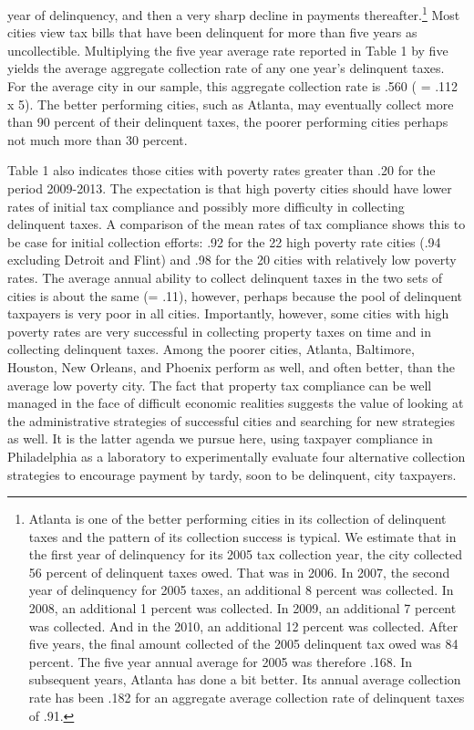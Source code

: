 \documentclass[12pt,titlepage]{article}
\begin{document}
year of delinquency, and then a very sharp decline in payments
thereafter.\footnote{Atlanta is one of the better performing cities in
  its collection of delinquent taxes and the pattern of its collection
  success is typical.  We estimate that in the first year of
  delinquency for its 2005 tax collection year, the city collected 56
  percent of delinquent taxes owed. That was in 2006.  In 2007, the
  second year of delinquency for 2005 taxes, an additional 8 percent
  was collected.  In 2008, an additional 1 percent was collected.  In
  2009, an additional 7 percent was collected.  And in the 2010, an
  additional 12 percent was collected.  After five years, the final
  amount collected of the 2005 delinquent tax owed was 84 percent.
  The five year annual average for 2005 was therefore .168.  In
  subsequent years, Atlanta has done a bit better.  Its annual average
  collection rate has been .182 for an aggregate average collection
  rate of delinquent taxes of .91.} Most cities view tax bills that
have been delinquent for more than five years as uncollectible.
Multiplying the five year average rate reported in Table 1 by five
yields the average aggregate collection rate of any one year's
delinquent taxes.  For the average city in our sample, this aggregate
collection rate is .560 ( = .112 x 5).  The better performing cities,
such as Atlanta, may eventually collect more than 90 percent of their
delinquent taxes, the poorer performing cities perhaps not much more
than 30 percent.  

Table 1 also indicates those cities with poverty rates greater than
.20 for the period 2009-2013.  The expectation is that high poverty
cities should have lower rates of initial tax compliance and possibly
more difficulty in collecting delinquent taxes.  A comparison of the
mean rates of tax compliance shows this to be case for initial
collection efforts: .92 for the 22 high poverty rate cities (.94
excluding Detroit and Flint) and .98 for the 20 cities with relatively
low poverty rates.  The average annual ability to collect delinquent
taxes in the two sets of cities is about the same (= .11), however,
perhaps because the pool of delinquent taxpayers is very poor in all
cities.  Importantly, however, some cities with high poverty rates are
very successful in collecting property taxes on time and in collecting
delinquent taxes.  Among the poorer cities, Atlanta, Baltimore,
Houston, New Orleans, and Phoenix perform as well, and often better,
than the average low poverty city.  The fact that property tax
compliance can be well managed in the face of difficult economic
realities suggests the value of looking at the administrative
strategies of successful cities and searching for new strategies as
well.  It is the latter agenda we pursue here, using taxpayer
compliance in Philadelphia as a laboratory to experimentally evaluate
four alternative collection strategies to encourage payment by tardy,
soon to be delinquent, city taxpayers.
\end{document}
